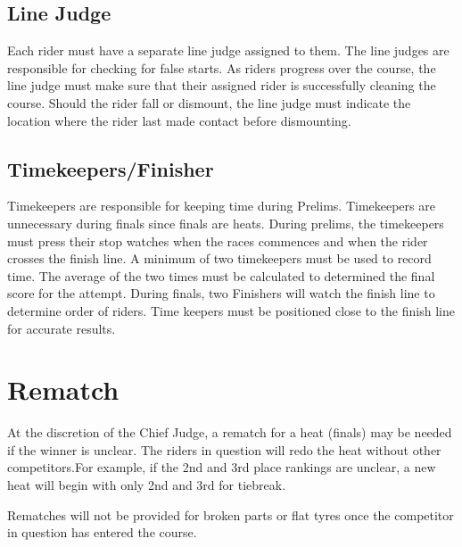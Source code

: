 \subsection{Line Judge}

Each rider must have a separate line judge assigned to them.
The line judges are responsible for checking for false starts.
As riders progress over the course, the line judge must make sure that their assigned rider is successfully cleaning the course.
Should the rider fall or dismount, the line judge must indicate the location where the rider last made contact before dismounting.

\subsection{Timekeepers/Finisher}
Timekeepers are responsible for keeping time during Prelims.
Timekeepers are unnecessary during finals since finals are heats.
During prelims, the timekeepers must press their stop watches when the races commences and when the rider crosses the finish line.
A minimum of two timekeepers must be used to record time.
The average of the two times must be calculated to determined the final score for the attempt.
During finals, two Finishers will watch the finish line to determine order of riders.
Time keepers must be positioned close to the finish line for accurate results.

\section{Rematch}

At the discretion of the Chief Judge, a rematch for a heat (finals) may be needed if the winner is unclear.
The riders in question will redo the heat without other competitors.For example, if the 2nd and 3rd place rankings are unclear, a new heat will begin with only 2nd and 3rd for tiebreak.

Rematches will not be provided for broken parts or flat tyres once the competitor in question has entered the course.
